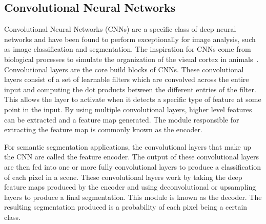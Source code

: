 \subsection{Convolutional Neural Networks}\label{section:background-cnn}
Convolutional Neural Networks (CNNs) are a specific class of deep neural networks and have been found to perform exceptionally for image analysis, such as image classification and segmentation.
The inspiration for CNNs come from biological processes to simulate the organization of the visual cortex in animals~\cite{cnnbiology}.
Convolutional layers are the core build blocks of CNNs.
These convolutional layers consist of a set of learnable filters which are convolved across the entire input and computing the dot products between the different entries of the filter.
This allows the layer to activate when it detects a specific type of feature at some point in the input.
By using multiple convolutional layers, higher level features can be extracted and a feature map generated.
The module responsible for extracting the feature map is commonly known as the encoder.

For semantic segmentation applications, the convolutional layers that make up the CNN are called the feature encoder.
The output of these convolutional layers are then fed into one or more fully convolutional layers to produce a classification of each pixel in a scene.
These convolutional layers work by taking the deep feature maps produced by the encoder and using deconvolutional or upsampling layers to produce a final segmentation.
This module is known as the decoder.
The resulting segmentation produced is a probability of each pixel being a certain class.
